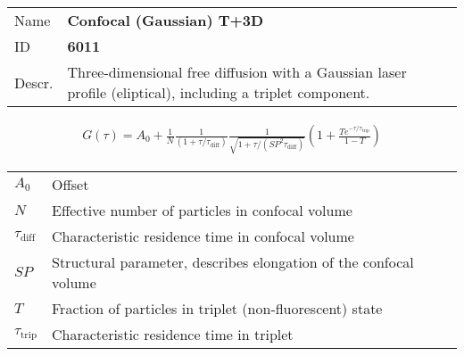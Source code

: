 

\noindent \begin{tabular}{lp{}}
Name & \textbf{Confocal (Gaussian) T+3D} \\ 
ID & \textbf{6011} \\ 
Descr. &  Three-dimensional free diffusion with a Gaussian laser profile (eliptical), including a triplet component\cite{Widengren1994, Widengren1995, Haupts1998}. \\ 
\end{tabular}
\begin{align}
G(\tau) = A_0 + \frac{1}{N} \frac{1}{(1+\tau/\tau_\mathrm{diff})} \frac{1}{\sqrt{1+\tau/(\mathit{SP}^2 \tau_\mathrm{diff})}} \left(1 + \frac{T e^{-\tau/\tau_\mathrm{trip}}}{1-T}  \right)
\end{align} 
\begin{center}
\begin{tabular}{ll}
$A_0$ & Offset \\ 
$N$ & Effective number of particles in confocal volume \\ 
$\tau_\mathrm{diff}$ &  Characteristic residence time in confocal volume \\ 
$\mathit{SP}$ & Structural parameter, describes elongation of the confocal volume \\
$T$ &  Fraction of particles in triplet (non-fluorescent) state\\ 
$\tau_\mathrm{trip}$ &  Characteristic residence time in triplet \\
\end{tabular}
\end{center}
\vspace{2em}




